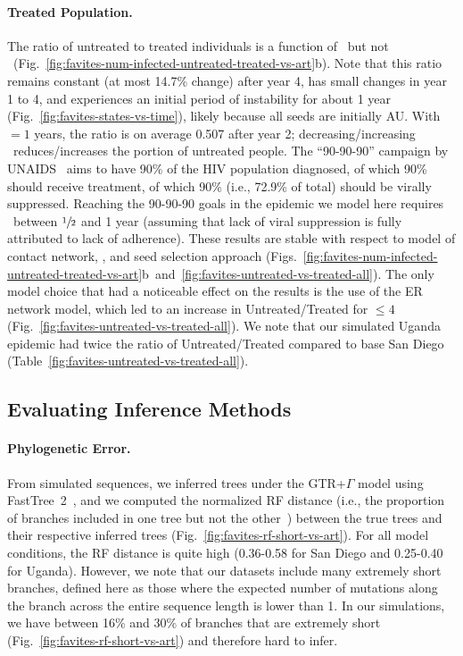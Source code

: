 \paragraph{Treated Population.} The ratio of untreated to treated individuals is a function of \EART\ but not \ED\ (Fig.~\ref{fig:favites-num-infected-untreated-treated-vs-art}b). Note that this ratio remains constant (at most 14.7\% change) after year 4, has small changes in year 1 to 4, and experiences an initial period of instability for about 1 year (Fig.~\ref{fig:favites-states-vs-time}), likely because all seeds are initially AU. With \EART$=1$ years, the ratio is on average 0.507 after year 2; decreasing/increasing \EART\ reduces/increases the portion of untreated people. The ``90-90-90'' campaign by \gls{UNAIDS}~\cite{UNAIDS2017} aims to have 90\% of the \gls{HIV} population diagnosed, of which 90\% should receive treatment, of which  90\% (i.e., 72.9\% of total) should be virally suppressed. Reaching the 90-90-90 goals in the epidemic we model here requires \EART\ between $\sfrac{1}{2}$ and 1 year (assuming that lack of viral suppression is fully attributed to lack of adherence). These results are stable with respect to model of contact network, \ED, and seed selection approach (Figs.~\ref{fig:favites-num-infected-untreated-treated-vs-art}b~and~\ref{fig:favites-untreated-vs-treated-all}). The only model choice that had a noticeable effect on the results is the use of the \gls{ER} network model, which led to an increase in Untreated/Treated for \ED$\leq 4$ (Fig.~\ref{fig:favites-untreated-vs-treated-all}). We note that our simulated Uganda epidemic had twice the ratio of Untreated/Treated compared to base San Diego (Table~\ref{fig:favites-untreated-vs-treated-all}).

\subsection{Evaluating Inference Methods}
\paragraph{Phylogenetic Error.} From simulated sequences, we inferred trees under the \gls{GTR}+$\Gamma$ model using FastTree~2~\cite{Price2010}, and we computed the normalized \gls{RF} distance (i.e., the proportion of branches included in one tree but not the other~\cite{Robinson1981}) between the true trees and their respective inferred trees (Fig.~\ref{fig:favites-rf-short-vs-art}). For all model conditions, the \gls{RF} distance is quite high (0.36-0.58 for San Diego and 0.25-0.40 for Uganda). However, we note that our datasets include many extremely short branches, defined here as those where the expected number of mutations along the branch across the entire sequence length is lower than 1. In our simulations, we have between 16\% and 30\% of branches that are extremely short (Fig.~\ref{fig:favites-rf-short-vs-art}) and therefore hard to infer.

